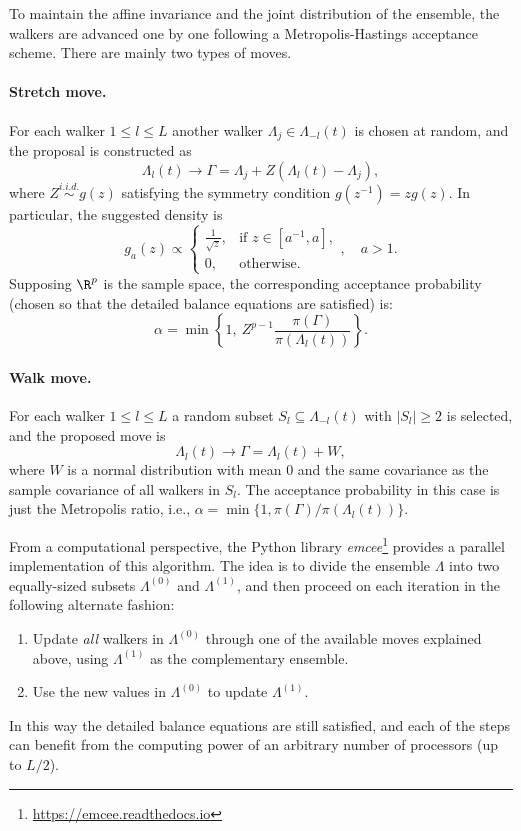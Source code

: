 To maintain the affine invariance and the joint distribution of the ensemble, the walkers are advanced one by one following a Metropolis-Hastings acceptance scheme. There are mainly two types of moves.

  \paragraph{Stretch move.} For each walker \(1\leq l \leq L\) another walker \(\Lambda_j \in \Lambda_{-l}(t)\) is chosen at random, and the proposal is constructed as
  \[
    \Lambda_l(t) \to \Gamma = \Lambda_j + Z(\Lambda_l(t) - \Lambda_j),
  \]
  where \(Z \stackrel{i.i.d.}{\sim} g(z)\) satisfying the symmetry condition \(g(z^{-1})=zg(z)\). In particular, the suggested density is
  \[
  g_a(z) \propto \begin{cases}
    \frac{1}{\sqrt{z}}, & \text{if } z \in [a^{-1}, a],\\
    0, & \text{otherwise.}
\end{cases}, \quad a > 1.
  \]
Supposing \(\R^p\) is the sample space, the corresponding acceptance probability (chosen so that the detailed balance equations are satisfied) is:
  \[
    \alpha = \min\left\{1, \ Z^{p-1}\frac{\pi(\Gamma)}{\pi(\Lambda_l(t))}\right\}.
  \]

  \setlength{\footskip}{60pt}

  \paragraph{Walk move.} For each walker \(1\leq l \leq L\) a random subset \(S_l \subseteq \Lambda_{-l}(t)\) with \(|S_l| \geq 2\) is selected, and the proposed move is
\[
\Lambda_l(t) \to \Gamma = \Lambda_l(t) + W,
\]
where \(W\) is a normal distribution with mean \(0\) and the same covariance as the sample covariance of all walkers in \(S_l\). The acceptance probability in this case is just the Metropolis ratio, i.e., \(\alpha=\min\{1, \pi(\Gamma)/\pi(\Lambda_l(t))\}\).

\vspace*{.75em}

From a computational perspective, the Python library \textit{emcee}\footnote{\url{https://emcee.readthedocs.io}} \citep{foreman2013emcee} provides a parallel implementation of this algorithm. The idea is to divide the ensemble \(\Lambda\) into two equally-sized subsets \(\Lambda^{(0)}\) and \(\Lambda^{(1)}\), and then proceed on each iteration in the following alternate fashion:

\enlargethispage{2\baselineskip}

\begin{enumerate}[1.]
  \item Update \textit{all} walkers in \(\Lambda^{(0)}\) through one of the available moves explained above, using \(\Lambda^{(1)}\) as the complementary ensemble.
  \item Use the new values in \(\Lambda^{(0)}\) to update \(\Lambda^{(1)}\).
\end{enumerate}

In this way the detailed balance equations are still satisfied, and each of the steps can benefit from the computing power of an arbitrary number of processors (up to \(L/2\)).
